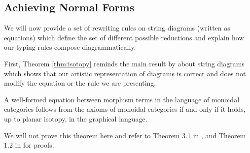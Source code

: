 \subsection{Achieving Normal Forms}
\label{subsec:normalforms}
We will now provide a set of rewriting rules on string diagrams (written as
equations) which define the set of different possible reductions and explain
how our typing rules compose diagrammatically.

First, Theorem \ref{thm:isotopy} reminds the main result by
\cite{joyalGeometryTensorCalculus1991} about string diagrams which shows that
our artistic representation of diagrams is correct and does not modify the
equation or the rule we are presenting.
\begin{thm}
	\label{thm:isotopy}
	A well-formed equation between morphism terms in the language of monoidal
	categories follows from the axioms of monoidal categories if and only if it
	holds, up to planar isotopy, in the graphical language.
\end{thm}
We will not prove this theorem here and refer to Theorem 3.1 in \cite{selingerSurveyGraphicalLanguages2010},
and Theorem 1.2 in \cite{joyalGeometryTensorCalculus1991} for proofs.

\medskip

